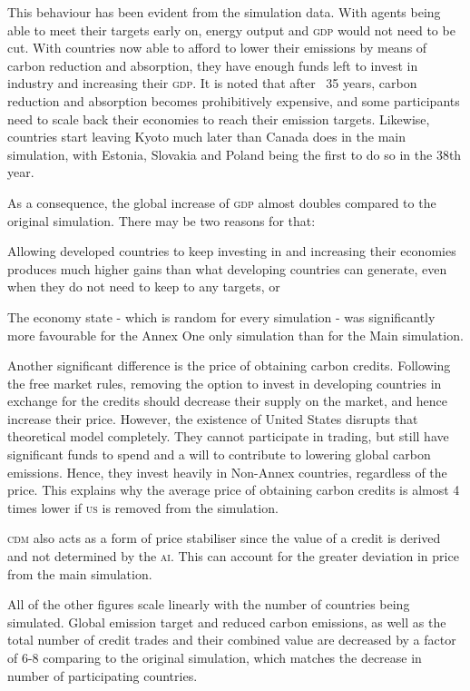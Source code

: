 This behaviour has been evident from the simulation data. With agents being able to meet their targets early on, energy output and \textsc{gdp} would not need to be cut. With countries now able to afford to lower their emissions by means of carbon reduction and absorption, they have enough funds left to invest in industry and increasing their \textsc{gdp}. It is noted that after ~35 years, carbon reduction and absorption becomes prohibitively expensive, and some participants need to scale back their economies to reach their emission targets. Likewise, countries start leaving Kyoto much later than Canada does in the main simulation, with Estonia, Slovakia and Poland being the first to do so in the 38th year.

As a consequence, the global increase of \textsc{gdp} almost doubles compared to the original simulation. There may be two reasons for that:

Allowing developed countries to keep investing in and increasing their economies produces much higher gains than what developing countries can generate, even when they do not need to keep to any targets, or

The economy state - which is random for every simulation - was significantly more favourable for the Annex One only simulation than for the Main simulation.

Another significant difference is the price of obtaining carbon credits. Following the free market rules, removing the option to invest in developing countries in exchange for the credits should decrease their supply on the market, and hence increase their price. However, the existence of United States disrupts that theoretical model completely. They cannot participate in trading, but still have significant funds to spend and a will to contribute to lowering global carbon emissions. Hence, they invest heavily in Non-Annex countries, regardless of the price. This explains why the average price of obtaining carbon credits is almost 4 times lower if \textsc{us} is removed from the simulation.

\textsc{cdm} also acts as a form of price stabiliser since the value of a credit is derived and not determined by the \textsc{ai}.  This can account for the greater deviation in price from the main simulation.

All of the other figures scale linearly with the number of countries being simulated. Global emission target and reduced carbon emissions, as well as the total number of credit trades and their combined value are decreased by a factor of 6-8 comparing to the original simulation, which matches the decrease in number of participating countries.

